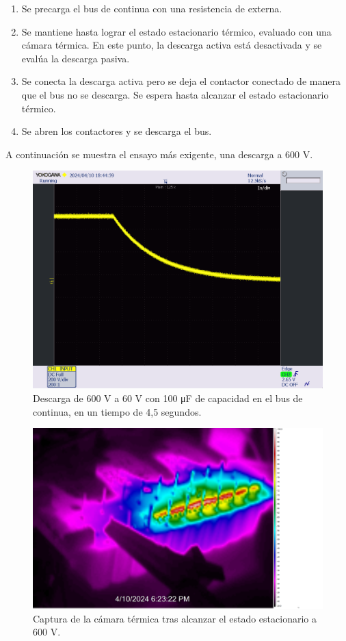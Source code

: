 \begin{enumerate}
	\item Se precarga el bus de continua con una resistencia de externa.
	\item Se mantiene hasta lograr el estado estacionario térmico, evaluado con una cámara térmica. En este punto, la descarga activa está desactivada y se evalúa la descarga pasiva.
	\item Se conecta la descarga activa pero se deja el contactor conectado de manera que el bus no se descarga. Se espera hasta alcanzar el estado estacionario térmico.
	\item Se abren los contactores y se descarga el bus.
\end{enumerate}

A continuación se muestra el ensayo más exigente, una descarga a 600 V.

\begin{figure}[H]
	\centering
	\includegraphics[width=0.7\linewidth]{fig/dischargeGuapo}
	\caption{Descarga de 600 V a 60 V con 100 \unit{\micro\farad} de capacidad en el bus de continua, en un tiempo de 4,5 segundos.}
\end{figure}

\begin{figure}[H]
	\centering
	\includegraphics[width=0.7\linewidth]{fig/dischargeGuapisimo}
	\caption{Captura de la cámara térmica tras alcanzar el estado estacionario a 600 V.}
\end{figure}



